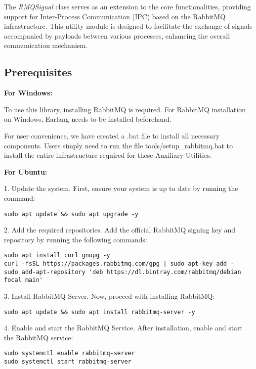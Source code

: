 The \emph{RMQSignal} class serves as an extension to the core functionalities, providing support for Inter-Process Communication (IPC) based on the RabbitMQ infrastructure. This utility module is designed to facilitate the exchange of signals accompanied by payloads between various processes, enhancing the overall communication mechanism.

\subsection{Prerequisites}
\label{subsubsec:prerequisites-details}

\textbf{For Windows:}

To use this library, installing RabbitMQ is required. For RabbitMQ installation on Windows, Earlang needs to be installed beforehand.

For user convenience, we have created a .bat file to install all necessary components. Users simply need to run the file tools/setup\_rabbitmq.bat to install the entire infrastructure required for these Auxiliary Utilities.

\textbf{For Ubuntu:}

1. Update the system. First, ensure your system is up to date by running the command:

\begin{verbatim}
sudo apt update && sudo apt upgrade -y
\end{verbatim}

2. Add the required repositories. Add the official RabbitMQ signing key and repository by running the following commands:

\begin{verbatim}
sudo apt install curl gnupg -y
curl -fsSL https://packages.rabbitmq.com/gpg | sudo apt-key add -
sudo add-apt-repository 'deb https://dl.bintray.com/rabbitmq/debian focal main'
\end{verbatim}

3. Install RabbitMQ Server. Now, proceed with installing RabbitMQ:

\begin{verbatim}
sudo apt update && sudo apt install rabbitmq-server -y
\end{verbatim}

4. Enable and start the RabbitMQ Service. After installation, enable and start the RabbitMQ service:

\begin{verbatim}
sudo systemctl enable rabbitmq-server
sudo systemctl start rabbitmq-server
\end{verbatim}

